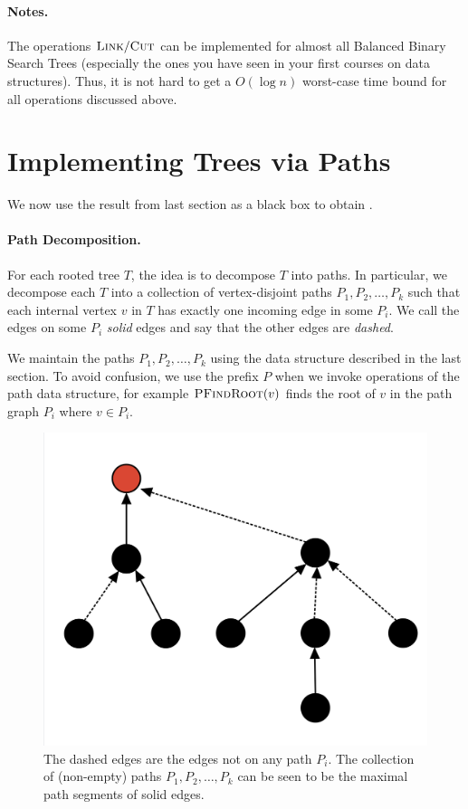 \paragraph{Notes.} The operations $\textsc{Link}/ \textsc{Cut}$ can be implemented for almost all Balanced Binary Search Trees (especially the ones you have seen in your first courses on data structures). Thus, it is not hard to get a $O(\log n)$ worst-case time bound for all operations discussed above.

\section{Implementing Trees via Paths}

We now use the result from last section as a black box to obtain .

\paragraph{Path Decomposition.} For each rooted tree $T$, the idea is to decompose $T$ into paths. In particular, we decompose each $T$ into a collection of vertex-disjoint paths $P_1, P_2, \dots, P_k$ such that each internal vertex $v$ in $T$ has exactly one incoming edge in some $P_i$. We call the edges on some $P_i$  \emph{solid} edges and say that the other edges are \emph{dashed}. 

We maintain the paths $P_1, P_2, \dots, P_k$ using the data structure described in the last section. To avoid confusion, we use the prefix $P$ when we invoke operations of the path data structure, for example $\textsc{PFindRoot}(v)$ finds the root of $v$ in the path graph $P_i$ where $v \in P_i$.

\begin{figure}[!ht]
    \centering
    \includegraphics[scale=0.20]{./fig/HeavyLightDecomposition_lectureDynamicTree.jpeg}
    \caption{The dashed edges are the edges not on any path $P_i$. The collection of (non-empty) paths $P_1, P_2, \dots, P_k$ can be seen to be the maximal path segments of solid edges.}
\end{figure}

